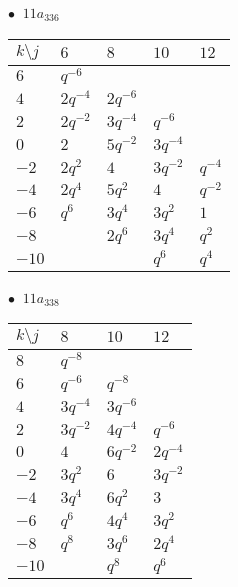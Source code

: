 \begin{minipage}{\linewidth}
$\bullet\ $ $11a_{336}$ \vspace{0.5em} \\
\begin{tabular}{l|llll}
$k \setminus j$ & $6$ & $8$ & $10$ & $12$ \\
\hline
$6$ & $q^{-6}$ &  &  &  \\
$4$ & $2q^{-4}$ & $2q^{-6}$ &  &  \\
$2$ & $2q^{-2}$ & $3q^{-4}$ & $q^{-6}$ &  \\
$0$ & $2$ & $5q^{-2}$ & $3q^{-4}$ &  \\
$-2$ & $2q^{2}$ & $4$ & $3q^{-2}$ & $q^{-4}$ \\
$-4$ & $2q^{4}$ & $5q^{2}$ & $4$ & $q^{-2}$ \\
$-6$ & $q^{6}$ & $3q^{4}$ & $3q^{2}$ & $1$ \\
$-8$ &  & $2q^{6}$ & $3q^{4}$ & $q^{2}$ \\
$-10$ &  &  & $q^{6}$ & $q^{4}$ \\
\end{tabular}
\vspace{2em}
\end{minipage}
%
\begin{minipage}{\linewidth}
$\bullet\ $ $11a_{338}$ \vspace{0.5em} \\
\begin{tabular}{l|lll}
$k \setminus j$ & $8$ & $10$ & $12$ \\
\hline
$8$ & $q^{-8}$ &  &  \\
$6$ & $q^{-6}$ & $q^{-8}$ &  \\
$4$ & $3q^{-4}$ & $3q^{-6}$ &  \\
$2$ & $3q^{-2}$ & $4q^{-4}$ & $q^{-6}$ \\
$0$ & $4$ & $6q^{-2}$ & $2q^{-4}$ \\
$-2$ & $3q^{2}$ & $6$ & $3q^{-2}$ \\
$-4$ & $3q^{4}$ & $6q^{2}$ & $3$ \\
$-6$ & $q^{6}$ & $4q^{4}$ & $3q^{2}$ \\
$-8$ & $q^{8}$ & $3q^{6}$ & $2q^{4}$ \\
$-10$ &  & $q^{8}$ & $q^{6}$ \\
\end{tabular}
\vspace{2em}
\end{minipage}
%

